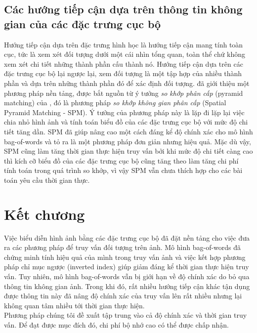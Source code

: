 \subsection{Các hướng tiếp cận dựa trên thông tin không gian của các đặc trưng cục bộ}
\label{spm}
Hướng tiếp cận dựa trên đặc trưng hình học là hướng tiếp cận mang tính toàn cục, tức là xem xét đối tượng dưới một cái nhìn tổng quan, toàn thể chứ không xem xét chi tiết những thành phần cấu thành nó. Hướng tiếp cận dựa trên các đặc trưng cục bộ lại ngược lại, xem đối tượng là một tập hợp của nhiều thành phần và dựa trên những thành phần đó để xác định đối tượng. \cite{lazebnik2006beyond} đã giới thiệu một phương pháp nền tảng, được bắt nguồn từ ý tưởng \textit{so khớp phân cấp} (pyramid matching) của \cite{grauman2005pyramid}, đó là phương pháp \textit{so khớp không gian phân cấp} (Spatial Pyramid Matching - SPM). Ý tưởng của phương pháp này là lặp đi lặp lại việc chia nhỏ hình ảnh và tính toán biểu đồ của các đặc trưng cục bộ với mức độ chi tiết tăng dần. SPM đã giúp nâng cao một cách đáng kể độ chính xác cho mô hình bag-of-words và tỏ ra là một phương pháp đơn giản nhưng hiệu quả. Mặc dù vậy, SPM cũng làm tăng thời gian thực hiện truy vấn bởi khi mức độ chi tiết càng cao thì kích cỡ biểu đồ của các đặc trưng cục bộ cũng tăng theo làm tăng chi phí tính toán trong quá trình so khớp, vì vậy SPM vẫn chưa thích hợp cho các bài toán yêu cầu thời gian thực.

\section{Kết chương}
Việc biểu diễn hình ảnh bằng các đặc trưng cục bộ đã đặt nền tảng cho việc đưa ra các phương pháp để truy vấn đối tượng trên ảnh. Mô hình bag-of-words đã chứng minh tính hiệu quả của mình trong truy vấn ảnh và việc kết hợp phương pháp chỉ mục ngược (inverted index) giúp giảm đáng kể thời gian thực hiện truy vấn. Tuy nhiên, mô hình bag-of-words vẫn bị giới hạn về độ chính xác do bỏ qua thông tin không gian ảnh. Trong khi đó, rất nhiều hướng tiếp cận khác tận dụng được thông tin này đã nâng độ chính xác của truy vấn lên rất nhiều nhưng lại không quan tâm nhiều tới thời gian thực hiện.\\
Phương pháp chúng tôi đề xuất tập trung vào cả độ chính xác và thời gian truy vấn. Để đạt được mục đích đó, chi phí bộ nhớ cao có thể được chấp nhận.

